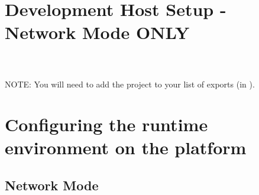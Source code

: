 \section{Development Host Setup - Network Mode ONLY}


%
\\\\NOTE: You will need to add the  project to your list of exports (in ).

\pagebreak
\section{Configuring the runtime environment on the platform}

\subsection{Network Mode}

